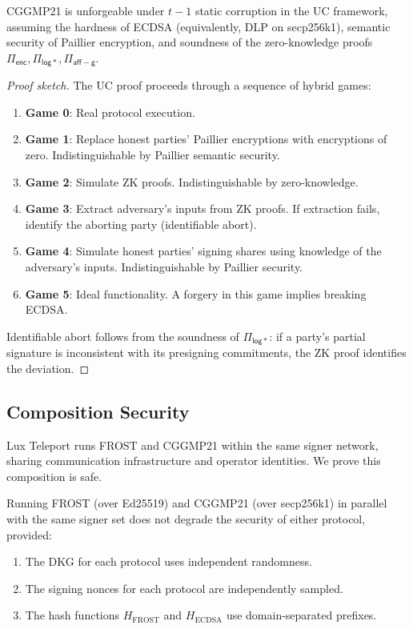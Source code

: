 \begin{theorem}
\label{thm:cggmp-uf}
CGGMP21 is unforgeable under $t{-}1$ static corruption in the UC framework,
assuming the hardness of ECDSA (equivalently, DLP on secp256k1), semantic security
of Paillier encryption, and soundness of the zero-knowledge proofs
$\Pi_{\mathsf{enc}}, \Pi_{\mathsf{log*}}, \Pi_{\mathsf{aff-g}}$.
\end{theorem}

\begin{proof}[Proof sketch]
The UC proof proceeds through a sequence of hybrid games:

\begin{enumerate}[nosep]
  \item \textbf{Game 0}: Real protocol execution.
  \item \textbf{Game 1}: Replace honest parties' Paillier encryptions with
    encryptions of zero. Indistinguishable by Paillier semantic security.
  \item \textbf{Game 2}: Simulate ZK proofs. Indistinguishable by zero-knowledge.
  \item \textbf{Game 3}: Extract adversary's inputs from ZK proofs. If extraction
    fails, identify the aborting party (identifiable abort).
  \item \textbf{Game 4}: Simulate honest parties' signing shares using knowledge of
    the adversary's inputs. Indistinguishable by Paillier security.
  \item \textbf{Game 5}: Ideal functionality. A forgery in this game implies breaking
    ECDSA.
\end{enumerate}

Identifiable abort follows from the soundness of $\Pi_{\mathsf{log*}}$: if a party's
partial signature is inconsistent with its presigning commitments, the ZK proof
identifies the deviation.
\end{proof}

\subsection{Composition Security}

Lux Teleport runs FROST and CGGMP21 within the same signer network, sharing
communication infrastructure and operator identities. We prove this composition is
safe.

\begin{theorem}
\label{thm:composition}
Running FROST (over Ed25519) and CGGMP21 (over secp256k1) in parallel with the same
signer set does not degrade the security of either protocol, provided:
\begin{enumerate}[nosep]
  \item The DKG for each protocol uses independent randomness.
  \item The signing nonces for each protocol are independently sampled.
  \item The hash functions $H_{\text{FROST}}$ and $H_{\text{ECDSA}}$ use
    domain-separated prefixes.
\end{enumerate}
\end{theorem}

